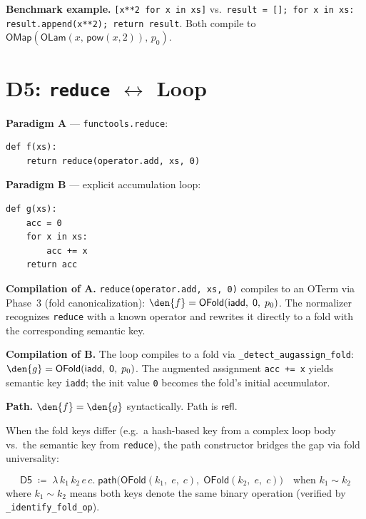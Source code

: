 \textbf{Benchmark example.}
\texttt{[x**2 for x in xs]} vs.\
\texttt{result = []; for x in xs: result.append(x**2); return result}.
Both compile to $\mathsf{OMap}(\mathsf{OLam}(x,\,
\mathsf{pow}(x, 2)),\, p_0)$.


\section{D5: \texttt{reduce} $\leftrightarrow$ Loop}
\label{sec:d5}

\textbf{Paradigm A} --- \texttt{functools.reduce}:
\begin{lstlisting}
def f(xs):
    return reduce(operator.add, xs, 0)
\end{lstlisting}

\textbf{Paradigm B} --- explicit accumulation loop:
\begin{lstlisting}
def g(xs):
    acc = 0
    for x in xs:
        acc += x
    return acc
\end{lstlisting}

\textbf{Compilation of A.}
\texttt{reduce(operator.add, xs, 0)} compiles to an OTerm via
Phase~3 (fold canonicalization):
$\den{f} = \mathsf{OFold}(\mathsf{iadd},\; \mathsf{0},\; p_0)$.
The normalizer recognizes \texttt{reduce} with a known operator
and rewrites it directly to a fold with the corresponding semantic
key.

\textbf{Compilation of B.}
The loop compiles to a fold via \texttt{\_detect\_augassign\_fold}:
$\den{g} = \mathsf{OFold}(\mathsf{iadd},\; \mathsf{0},\; p_0)$.
The augmented assignment \texttt{acc += x} yields semantic key
\texttt{iadd}; the init value \texttt{0} becomes the fold's initial
accumulator.

\textbf{Path.}
$\den{f} = \den{g}$ syntactically.  Path is $\mathsf{refl}$.

When the fold keys differ (e.g.\ a hash-based key from a complex
loop body vs.\ the semantic key from \texttt{reduce}), the path
constructor bridges the gap via fold universality:

\begin{definition}
\label{def:d5-path}
\[
  \mathsf{D5} \;\coloneqq\; \lambda\, k_1\, k_2\, e\, c.\;
  \mathsf{path}\!\big(
    \mathsf{OFold}(k_1,\; e,\; c),\;
    \mathsf{OFold}(k_2,\; e,\; c)
  \big)
  \quad\text{when } k_1 \sim k_2
\]
where $k_1 \sim k_2$ means both keys denote the same binary
operation (verified by \texttt{\_identify\_fold\_op}).
\end{definition}

